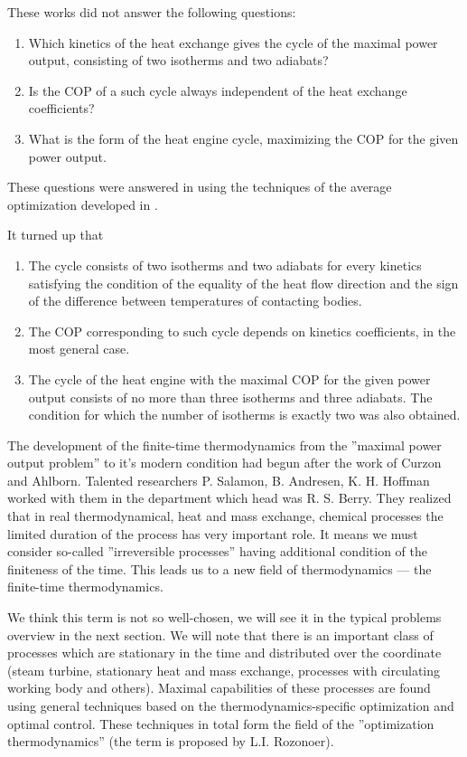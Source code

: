 \documentclass[epjST]{svjour}
\begin{document}
These works did not answer the following questions:
\begin{enumerate}
\item Which kinetics of the heat exchange gives the cycle of the maximal power output, consisting of two isotherms and two adiabats?
\item Is the COP of a such cycle always independent of the heat exchange coefficients?
\item What is the form of the heat engine cycle, maximizing the COP for the given power output.
\end{enumerate}

These questions were answered in \cite{RosTs}\cite{BeKaSi} using the techniques of the average optimization developed in \cite{Ts1}.
 
It turned up that
\begin{enumerate}
\item The cycle consists of two isotherms and two adiabats for every kinetics satisfying the condition of the equality of the heat flow direction and the sign of the difference between temperatures of contacting bodies.
\item The COP corresponding to such cycle depends on kinetics coefficients, in the most general case.
\item The cycle of the heat engine with the maximal COP for the given power output consists of no more than three isotherms and three adiabats. The condition for which the number of isotherms is exactly two was also obtained.
\end{enumerate}

The development of the finite-time thermodynamics from the ''maximal power output problem'' to it's modern condition had begun after the work of Curzon and Ahlborn\cite{CurAhl}. Talented researchers P. Salamon, B. Andresen, K. H. Hoffman worked with them in the department which head was R. S. Berry. They realized that in real thermodynamical, heat and mass exchange, chemical processes the limited duration of the process has very important role. It means we must consider so-called ''irreversible processes'' having additional condition of the finiteness of the time. This leads us to a new field of thermodynamics --- the finite-time thermodynamics\cite{SalHoSch}\cite{AndSalBe}\cite{AndSalBe2}\cite{And}.

We think this term is not so well-chosen, we will see it in the typical problems overview in the next section. We will note that there is an important class of processes which are stationary in the time and distributed over the coordinate (steam turbine, stationary heat and mass exchange, processes with circulating working body and others). Maximal capabilities of these processes are found using general techniques based on the thermodynamics-specific optimization and optimal control. These techniques in total form the field of the ''optimization thermodynamics'' (the term is proposed by L.I. Rozonoer).
\end{document}
